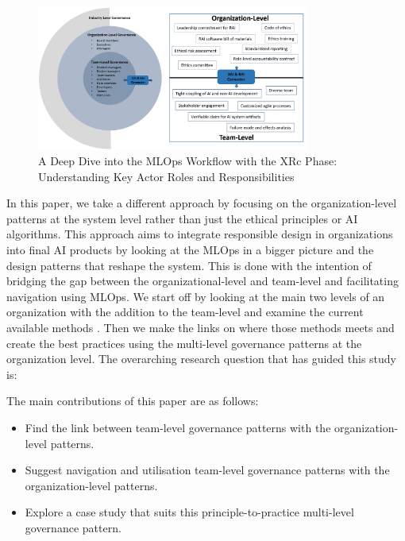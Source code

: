 \documentclass[conference]{IEEEtran}
\begin{document}
\begin{figure}[htbp!!]
	\centering
	\includegraphics[width=0.8\textwidth]{Organization.png}
	\caption{A Deep Dive into the MLOps Workflow with the XRc Phase: Understanding Key Actor Roles and Responsibilities}
	\label{XAIRAIorg}
\end{figure}
In this paper, we take a different approach by focusing on the organization-level patterns at the system level rather than just the ethical principles or AI algorithms. This approach aims to integrate responsible design in organizations into final AI products by looking at the MLOps in a bigger picture and the design patterns that reshape the system. This is done with the intention of bridging the gap between the organizational-level and team-level and facilitating navigation using MLOps. We start off by looking at the main two levels of an organization with the addition to the team-level and examine the current available methods \cite{Shneiderman, ShneidermanRespo, Jana, Hussain, roadmap}. Then we make the links on where those methods meets and create the best practices using the multi-level governance patterns at the organization level. The overarching research question that has guided this study is:


\vskip 0.1in
\vskip 0.1in

\noindent{}

\vskip 0.1in
\vskip 0.1in

The main contributions of this paper are as follows:
\begin{itemize}
\item Find the link between team-level governance patterns with the organization-level patterns.
\item Suggest navigation and utilisation team-level governance patterns with the organization-level patterns.
\item Explore a case study that suits this principle-to-practice multi-level governance pattern.
\end{itemize}
\smallskip
\end{document}
